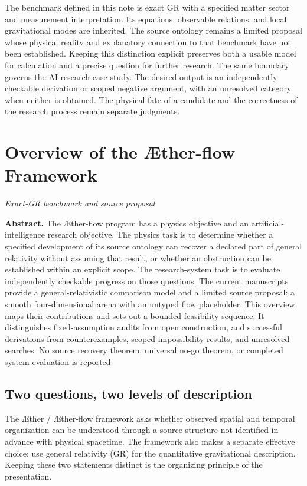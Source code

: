 \documentclass[11pt,oneside]{report}
\newcommand{\ArticleShort}{}
\newcommand{\Aether}{\AE{}ther}
\newcommand{\Aflow}{\AE{}ther-flow}
\newcommand{\TheoryProgram}{\Aether{} / \Aflow{} framework}
\theoremstyle{remark}
\numberwithin{definition}{chapter}
\numberwithin{proposition}{chapter}
\numberwithin{remark}{chapter}
\newcommand{\ChapterAbstract}[1]{%
  \begingroup
  \setlength{\parindent}{0pt}%
  \small\textbf{Abstract.} #1\par
  \endgroup
  \vspace{0.55\baselineskip}%
}
\begin{document}
The benchmark defined in this note is exact GR with a specified matter sector and measurement interpretation. Its equations, observable relations, and local gravitational modes are inherited. The source ontology remains a limited proposal whose physical reality and explanatory connection to that benchmark have not been established. Keeping this distinction explicit preserves both a usable model for calculation and a precise question for further research.
The same boundary governs the AI research case study. The desired output is an independently checkable derivation or scoped negative argument, with an unresolved category when neither is obtained. The physical fate of a candidate and the correctness of the research process remain separate judgments.

\clearpage
\renewcommand{\ArticleShort}{Sequence overview}
\chapter{Overview of the \Aflow{} Framework}
\label{chapter:exact_closure_sequence_overview}
{\noindent\normalsize\itshape Exact-GR benchmark and source proposal\par}\vspace{0.55\baselineskip}
\ChapterAbstract{The \Aflow{} program has a physics objective and an artificial-intelligence research objective. The physics task is to determine whether a specified development of its source ontology can recover a declared part of general relativity without assuming that result, or whether an obstruction can be established within an explicit scope. The research-system task is to evaluate independently checkable progress on those questions. The current manuscripts provide a general-relativistic comparison model and a limited source proposal: a smooth four-dimensional arena with an untyped flow placeholder. This overview maps their contributions and sets out a bounded feasibility sequence. It distinguishes fixed-assumption audits from open construction, and successful derivations from counterexamples, scoped impossibility results, and unresolved searches. No source recovery theorem, universal no-go theorem, or completed system evaluation is reported.}

\section{Two questions, two levels of description}
The \TheoryProgram{} asks whether observed spatial and temporal organization can be understood through a source structure not identified in advance with physical spacetime. The framework also makes a separate effective choice: use general relativity (GR) for the quantitative gravitational description. Keeping these two statements distinct is the organizing principle of the presentation.
\end{document}
